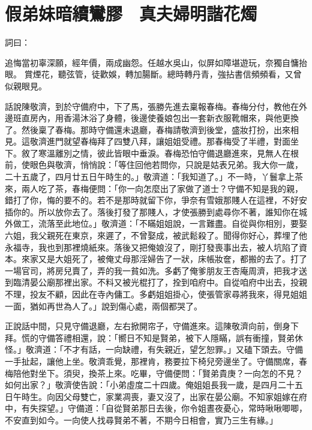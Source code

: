 %

\chapter{假弟妹暗續鸞膠　真夫婦明諧花燭}

詞曰：

追悔當初辜深願，經年價，兩成幽怨。任越水吳山，似屏如障堪遊玩，奈獨自慵抬眼。
賞煙花，聽弦管，徒歡娛，轉加腸斷。總時轉丹青，強拈書信頻頻看，又曾似親眼見。

話說陳敬濟，到於守備府中，下了馬，張勝先進去稟報春梅。春梅分付，教他在外邊班直房內，用香湯沐浴了身體，後邊使養娘包出一套新衣服靴帽來，與他更換了。然後稟了春梅。那時守備還未退廳，春梅請敬濟到後堂，盛妝打扮，出來相見。這敬濟進門就望春梅拜了四雙八拜，讓姐姐受禮。那春梅受了半禮，對面坐下。敘了寒溫離別之情，彼此皆眼中垂淚。春梅恐怕守備退廳進來，見無人在根前，使眼色與敬濟，悄悄說：「等住回他若問你，只說是姑表兄弟。我大你一歲，二十五歲了，四月廿五日午時生的。」敬濟道：「我知道了。」不一時，丫鬟拿上茶來，兩人吃了茶，春梅便問：「你一向怎麼出了家做了道士？守備不知是我的親，錯打了你，悔的要不的。若不是那時就留下你，爭奈有雪娥那賤人在這裡，不好安插你的。所以放你去了。落後打發了那賤人，才使張勝到處尋你不著，誰知你在城外做工，流落至此地位。」敬濟道：「不瞞姐姐說，一言難盡。自從與你相別，要娶六姐，我父親死在東京，來遲了，不曾娶成，被武鬆殺了。聞得你好心，葬埋了他永福寺，我也到那裡燒紙來。落後又把俺娘沒了，剛打發喪事出去，被人坑陷了資本。來家又是大姐死了，被俺丈母那淫婦告了一狀，床帳妝奩，都搬的去了。打了一場官司，將房兒賣了，弄的我一貧如洗。多虧了俺爹朋友王杏庵周濟，把我才送到臨清晏公廟那裡出家。不料又被光棍打了，拴到咱府中。自從咱府中出去，投親不理，投友不顧，因此在寺內傭工。多虧姐姐掛心，使張管家尋將我來，得見姐姐一面，猶如再世為人了。」說到傷心處，兩個都哭了。

正說話中間，只見守備退廳，左右掀開帘子，守備進來。這陳敬濟向前，倒身下拜。慌的守備答禮相還，說：「嚮日不知是賢弟，被下人隱瞞，誤有衝撞，賢弟休怪。」敬濟道：「不才有話，一向缺禮，有失親近，望乞恕罪。」又磕下頭去。守備一手扯起，讓他上坐。敬濟乖覺，那裡肯，務要拉下椅兒旁邊坐了。守備關席，春梅陪他對坐下。須臾，換茶上來。吃畢，守備便問：「賢弟貴庚？一向怎的不見？如何出家？」敬濟使告說：「小弟虛度二十四歲。俺姐姐長我一歲，是四月二十五日午時生。向因父母雙亡，家業凋喪，妻又沒了，出家在晏公廟。不知家姐嫁在府中，有失探望。」守備道：「自從賢弟那日去後，你令姐晝夜憂心，常時啾啾唧唧，不安直到如今。一向使人找尋賢弟不著，不期今日相會，實乃三生有緣。」

